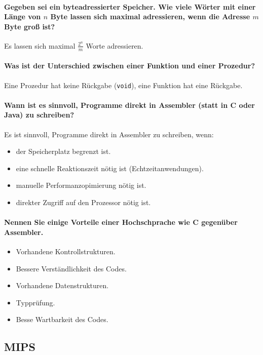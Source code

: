 		\paragraph{Gegeben sei ein byteadressierter Speicher. Wie viele Wörter mit einer Länge von $ n $ Byte lassen sich maximal adressieren, wenn die Adresse $ m $ Byte groß ist?}
			Es lassen sich maximal $ \frac{2 ^ n}{m} $ Worte adressieren.

		\paragraph{Was ist der Unterschied zwischen einer Funktion und einer Prozedur?}
			Eine Prozedur hat keine Rückgabe (\texttt{void}), eine Funktion hat eine Rückgabe.

		\paragraph{Wann ist es sinnvoll, Programme direkt in Assembler (statt in C oder Java) zu schreiben?}
			Es ist sinnvoll, Programme direkt in Assembler zu schreiben, wenn:
			\begin{itemize}
				\item der Speicherplatz begrenzt ist.
				\item eine schnelle Reaktionszeit nötig ist (Echtzeitanwendungen).
				\item manuelle Performanzopimierung nötig ist.
				\item direkter Zugriff auf den Prozessor nötig ist.
			\end{itemize}

		\paragraph{Nennen Sie einige Vorteile einer Hochschprache wie C gegenüber Assembler.}
			\begin{itemize}
				\item Vorhandene Kontrollstrukturen.
				\item Bessere Verständlichkeit des Codes.
				\item Vorhandene Datenstrukturen.
				\item Typprüfung.
				\item Besse Wartbarkeit des Codes.
			\end{itemize}

		\subsection{MIPS}
